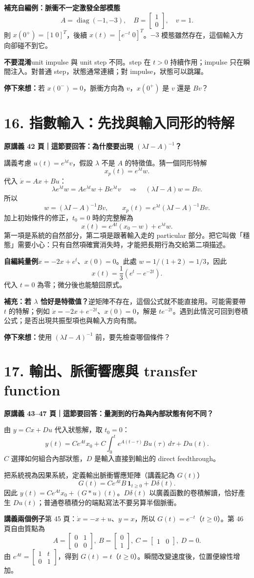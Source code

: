 \documentclass[12pt,a4paper]{article}
\newcommand{\topic}[3]{\clearpage\section*{#1}\textcolor{accent}{\textbf{原講義 #2 頁｜這節要回答：#3}}\par}
\newcommand{\checkq}[1]{\par\textbf{停下來想：}#1\par}
\DeclareMathOperator{\diag}{diag}
\begin{document}
\textbf{補充自編例：脈衝不一定激發全部模態}\quad
\[
 A=\diag(-1,-3),\quad B=\begin{bmatrix}1\\0\end{bmatrix},\quad v=1.
\]
則 $x(0^+)=[1\;0]^T$，後續 $x(t)=[e^{-t}\;0]^T$。$-3$ 模態雖然存在，這個輸入方向卻碰不到它。

\textbf{不要混淆}\quad unit impulse 與 unit step 不同。step 在 $t>0$ 持續作用；impulse 只在瞬間注入。對普通 step，狀態通常連續；對 impulse，狀態可以跳躍。
\checkq{若 $x(0^-)=0$，脈衝方向為 $v$，$x(0^+)$ 是 $v$ 還是 $Bv$？}

\topic{16. 指數輸入：先找與輸入同形的特解}{42}{為什麼要出現 $(\lambda I-A)^{-1}$？}
講義考慮 $u(t)=e^{\lambda t}v$，假設 $\lambda$ 不是 $A$ 的特徵值。猜一個同形特解
\[
 x_p(t)=e^{\lambda t}w.
\]
代入 $\dot x=Ax+Bu$：
\[
 \lambda e^{\lambda t}w=Ae^{\lambda t}w+Be^{\lambda t}v
 \quad\Rightarrow\quad (\lambda I-A)w=Bv.
\]
所以
\[
 w=(\lambda I-A)^{-1}Bv,\qquad
 x_p(t)=e^{\lambda t}(\lambda I-A)^{-1}Bv.
\]
加上初始條件的修正，$t_0=0$ 時的完整解為
\[
\boxed{x(t)=e^{At}(x_0-w)+e^{\lambda t}w.}
\]
第一項是系統的自然部分，第二項是跟著輸入走的 particular 部分。把它叫做「穩態」需要小心：只有自然項確實消失時，才能把長期行為交給第二項描述。

\textbf{自編純量例}\quad $\dot x=-2x+e^t$、$x(0)=0$。此處 $w=1/(1+2)=1/3$，因此
\[
 x(t)=\frac13(e^t-e^{-2t}).
\]
代入 $t=0$ 為零；微分後也能驗回原式。

\textbf{補充：若 $\lambda$ 恰好是特徵值？}\quad 逆矩陣不存在，這個公式就不能直接用。可能需要帶 $t$ 的特解；例如 $\dot x=-2x+e^{-2t}$、$x(0)=0$，解是 $te^{-2t}$。遇到此情況可回到卷積公式；是否出現共振型項也與輸入方向有關。
\checkq{使用 $(\lambda I-A)^{-1}$ 前，要先檢查哪個條件？}

\topic{17. 輸出、脈衝響應與 transfer function}{43--47}{量測到的行為與內部狀態有何不同？}
由 $y=Cx+Du$ 代入狀態解，取 $t_0=0$：
\[
 y(t)=Ce^{At}x_0+
 C\int_0^t e^{A(t-\tau)}Bu(\tau)\,d\tau+Du(t).
\]
$C$ 選擇如何組合內部狀態，$D$ 是輸入直接到輸出的 direct feedthrough。

把系統視為因果系統，定義輸出脈衝響應矩陣（講義記為 $G(t)$）
\[
\boxed{G(t)=Ce^{At}B\,\mathbf 1_{t\ge0}+D\delta(t).}
\]
因此 $y(t)=Ce^{At}x_0+(G*u)(t)$。$D\delta(t)$ 以廣義函數的卷積解讀，恰好產生 $Du(t)$；普通卷積積分的端點寫法不要另算半個脈衝。

\textbf{講義兩個例子}\quad 第 45 頁：$\dot x=-x+u$、$y=x$，所以 $G(t)=e^{-t}$（$t\ge0$）。第 46 頁自由質點為
\[
 A=\begin{bmatrix}0&1\\0&0\end{bmatrix},\ B=\begin{bmatrix}0\\1\end{bmatrix},\ C=\begin{bmatrix}1&0\end{bmatrix},\ D=0.
\]
由 $e^{At}=\begin{bmatrix}1&t\\0&1\end{bmatrix}$，得到 $G(t)=t$（$t\ge0$）。瞬間改變速度後，位置便線性增加。
\end{document}
